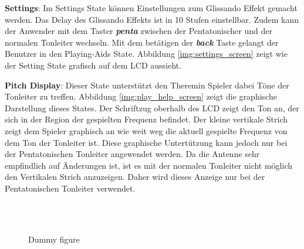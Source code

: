 \textbf{Settings}:
Im Settings State können Einstellungen zum Glissando Effekt gemacht werden. Das Delay des Glissando Effekts ist in 10 Stufen einstellbar. Zudem kann der Anwender mit dem Taster \textbf{\textit{penta}} zwischen der Pentatonischer und der normalen Tonleiter wechseln. Mit dem betätigen der \textbf{\textit{back}} Taste gelangt der Benutzer in den Playing-Aids State. Abbildung \ref{img:settings_screen} zeigt wie der Setting State grafisch auf dem LCD aussieht.

\textbf{Pitch Display}:
Dieser State unterstützt den Theremin Spieler dabei Töne der Tonleiter zu treffen.   Abbildung \ref{img:play_help_screen} zeigt die graphische Darstellung dieses States.  
Der Schriftzug oberhalb des LCD zeigt den Ton an, der sich in der Region der gespielten Frequenz befindet. 
Der kleine vertikale Strich zeigt dem Spieler graphisch an wie weit weg die aktuell gespielte Frequenz von dem Ton der Tonleiter ist. 
Diese graphische Untertützung kann jedoch nur bei der Pentatonischen Tonleiter angewendet werden.  Da die Antenne sehr empfindlich auf Änderungen ist, ist es mit der normalen Tonleiter nicht möglich den Vertikalen Strich anzuzeigen. Daher wird dieses Anzeige nur bei der Pentatonischen Tonleiter verwendet.

\begin{figure}[!ht]
	\hfill
	\hfill
	\\
	\hfill
	\hfill
	\\
	\hfill

	\caption{Dummy figure}
	\label{fig:dummy}
\end{figure}

